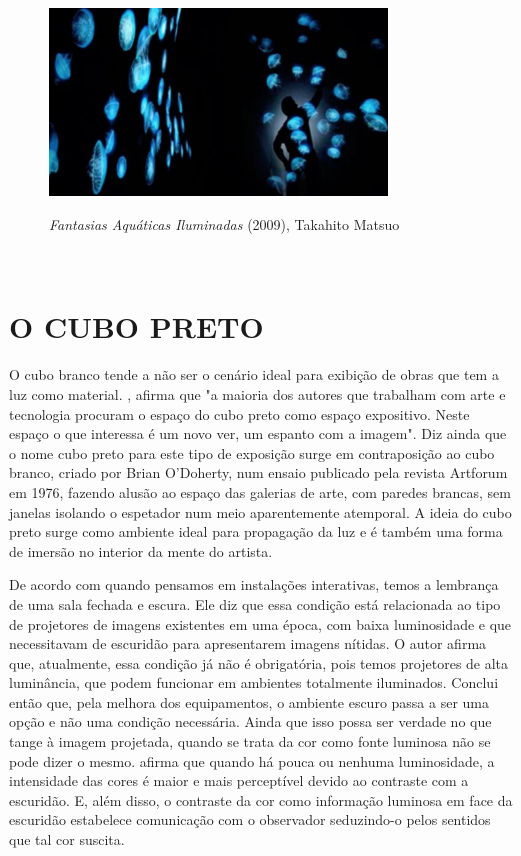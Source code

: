 \begin{figure}[H]
    \centering
    \caption{\textit{Fantasias Aquáticas Iluminadas} (2009), Takahito Matsuo}
	\vspace*{0,2cm}
    \includegraphics[width=0.8\textwidth]{./04-figuras/takahito_matsuo}
    \label{fig:takahito_matsuo}
\end{figure}
\vspace*{-0,9cm}
{\raggedright {}}\\


\section{O CUBO PRETO}

O cubo branco tende a não ser o cenário ideal para exibição de obras que tem a luz como material. , afirma que "a maioria dos autores que trabalham com arte e tecnologia procuram o espaço do cubo preto como espaço expositivo. Neste espaço o que interessa é um novo ver, um espanto com a imagem". Diz ainda que o nome cubo preto para este tipo de exposição surge em contraposição ao cubo branco, criado por Brian O'Doherty, num ensaio publicado pela revista Artforum em 1976, fazendo alusão ao espaço das galerias de arte, com paredes brancas, sem janelas isolando o espetador num meio aparentemente atemporal. A ideia do cubo preto surge como ambiente ideal para propagação da luz e é também uma forma de imersão no interior da mente do artista.

De acordo com  quando pensamos em instalações interativas, temos a lembrança de uma sala fechada e escura. Ele diz que essa condição está relacionada ao tipo de projetores de imagens existentes em uma época, com baixa luminosidade e que necessitavam de escuridão para apresentarem imagens nítidas. O autor afirma que, atualmente, essa condição já não é obrigatória, pois temos projetores de alta luminância, que podem funcionar em ambientes totalmente iluminados. Conclui então que, pela melhora dos equipamentos, o ambiente escuro passa a ser uma opção e não uma condição necessária. Ainda que isso possa ser verdade no que tange à imagem projetada, quando se trata da cor como fonte luminosa não se pode dizer o mesmo.  afirma que quando há pouca ou nenhuma luminosidade, a intensidade das cores é maior e mais perceptível devido ao contraste com a escuridão. E, além disso, o contraste da cor como informação luminosa em face da escuridão estabelece comunicação com o observador seduzindo-o pelos sentidos que tal cor suscita.

